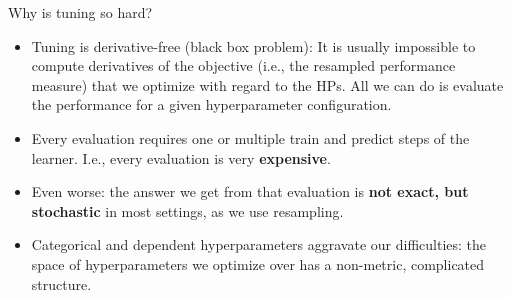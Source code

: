 \begin{frame}{Why is tuning so hard?}
\begin{itemize}
\item Tuning is derivative-free (black box problem): It is usually impossible to compute derivatives of the objective (i.e., the resampled performance measure) that we optimize with regard to the HPs. All we can do is evaluate the performance for a given hyperparameter configuration.
\item Every evaluation requires one or multiple train and predict steps of the learner. I.e., every evaluation is very \textbf{expensive}.
\item Even worse: the answer we get from that evaluation is \textbf{not exact, but stochastic} in most settings, as we use resampling.
\item Categorical and dependent hyperparameters aggravate our difficulties: the space of hyperparameters we optimize over has a non-metric, complicated structure.
\end{itemize}

\end{frame}


